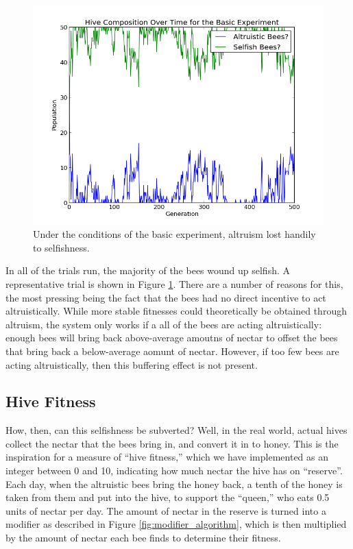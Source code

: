 \documentclass[11pt]{article}
\begin{document}
			\begin{figure}[tb]
				\begin{center}
					\includegraphics[scale=.75]{results/basic_comp.png}
				\end{center}
				\caption{Under the conditions of the basic experiment, altruism lost handily to selfishness.}
				\label{fig:basic_experiment_composition}
			\end{figure}

			In all of the trials run, the majority of the bees wound up selfish. A representative trial is shown in Figure \ref{fig:basic_experiment_composition}. There are a number of reasons for this, the most pressing being the fact that the bees had no direct incentive to act altruistically. While more stable fitnesses could theoretically be obtained through altruism, the system only works if a all of the bees are acting altruistically: enough bees will bring back above-average amoutns of nectar to offset the bees that bring back a below-average aomunt of nectar. However, if too few bees are acting altruistically, then this buffering effect is not present. 



		\subsection{Hive Fitness} %
		\label{sub:hive_fitness}
			How, then, can this selfishness be subverted? Well, in the real world, actual hives collect the nectar that the bees bring in, and convert it in to honey. This is the inspiration for a measure of ``hive fitness,'' which we have implemented as an integer between 0 and 10, indicating how much nectar the hive has on ``reserve''. Each day, when the altruistic bees bring the honey back, a tenth of the honey is taken from them and put into the hive, to support the ``queen,'' who eats 0.5 units of nectar per day. The amount of nectar in the reserve is turned into a modifier as described in Figure \ref{fig:modifier_algorithm}, which is then multiplied by the amount of nectar each bee finds to determine their fitness.
\end{document}
